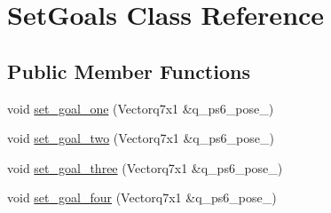 \hypertarget{class_set_goals}{\section{Set\-Goals Class Reference}
\label{class_set_goals}
}
\subsection*{Public Member Functions}
\begin{DoxyCompactItemize}
\item 
void \hyperlink{class_set_goals_aae419f9ff98383f8a256fb9e7e801fdd}{set\-\_\-goal\-\_\-one} (Vectorq7x1 \&q\-\_\-ps6\-\_\-pose\-\_)
\item 
void \hyperlink{class_set_goals_a792824a136b4f42bfa3de805acfb08a2}{set\-\_\-goal\-\_\-two} (Vectorq7x1 \&q\-\_\-ps6\-\_\-pose\-\_)
\item 
void \hyperlink{class_set_goals_a91eb9db554fbbefa654a9fbf0273beac}{set\-\_\-goal\-\_\-three} (Vectorq7x1 \&q\-\_\-ps6\-\_\-pose\-\_)
\item 
void \hyperlink{class_set_goals_a524d75947b50090c7e5c01ccd001aa26}{set\-\_\-goal\-\_\-four} (Vectorq7x1 \&q\-\_\-ps6\-\_\-pose\-\_)
\end{DoxyCompactItemize}


